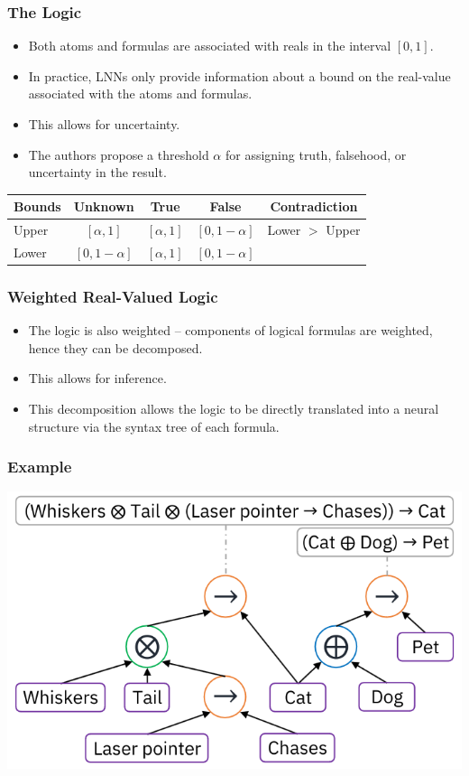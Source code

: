 \documentclass{beamer}
\begin{document}
\begin{frame}
\frametitle{The Logic}
\begin{itemize}
    \item Both atoms and formulas are associated with reals in the
      interval $[0,1]$.
    \item In practice, LNNs only provide information about a bound on
      the real-value associated with the atoms and formulas.
    \item This allows for uncertainty.
    \item The authors propose a threshold $\alpha$ for assigning
      truth, falsehood, or uncertainty in the result.
\end{itemize}
\bigskip %
\begin{tabular}{lcccc}
\hline
\textbf{Bounds} & \textbf{Unknown} & \textbf{True} & \textbf{False} &
                                                                      \textbf{Contradiction} \\
\hline
  Upper & $[\alpha, 1]$ & $[\alpha, 1]$ & $[0, 1 - \alpha]$ & Lower $>$ Upper \\
  Lower & $[0, 1 - \alpha]$ & $[\alpha, 1]$ & $[0, 1 - \alpha]$ & \\
\hline
\end{tabular}
\end{frame}

\begin{frame}
\frametitle{Weighted Real-Valued Logic}
\begin{itemize}
    \item The logic is also weighted -- components of logical formulas
      are weighted, hence they can be decomposed.
    \item This allows for inference.
    \item This decomposition allows the logic to be directly
      translated into a neural structure via the syntax tree of each
      formula.
\end{itemize}
\end{frame}


\begin{frame}
  \frametitle{Example}
  \centerline{\includegraphics[width=.8\textwidth]{lnn1.png}}
\end{frame}
\end{document}
